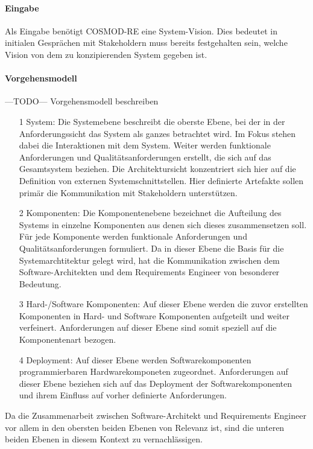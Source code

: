 \paragraph{Eingabe}
Als Eingabe benötigt COSMOD-RE eine System-Vision. Dies bedeutet in initialen Gesprächen mit Stakeholdern muss bereits festgehalten sein, welche Vision von dem zu konzipierenden System gegeben ist.\\

\paragraph{Vorgehensmodell}
---TODO--- Vorgehensmodell beschreiben
\begin{itemize}
\item[1] System: Die Systemebene beschreibt die oberste Ebene, bei der in der Anforderungssicht das System als ganzes betrachtet wird. Im Fokus stehen dabei die Interaktionen mit dem System. Weiter werden funktionale Anforderungen und Qualitätsanforderungen erstellt, die sich auf das Gesamtsystem beziehen. Die Architektursicht konzentriert sich hier auf die Definition von externen Systemschnittstellen. Hier definierte Artefakte sollen primär die Kommunikation mit Stakeholdern unterstützen.
\item[2] Komponenten: Die Komponentenebene bezeichnet die Aufteilung des Systems in einzelne Komponenten aus denen sich dieses zusammensetzen soll. Für jede Komponente werden funktionale Anforderungen und Qualitätsanforderungen formuliert. Da in dieser Ebene die Basis für die Systemarchtitektur gelegt wird, hat die Kommunikation zwischen dem Software-Architekten und dem Requirements Engineer von besonderer Bedeutung. 
\item[3] Hard-/Software Komponenten: Auf dieser Ebene werden die zuvor erstellten Komponenten in Hard- und Software Komponenten aufgeteilt und weiter verfeinert. Anforderungen auf dieser Ebene sind somit speziell auf die Komponentenart bezogen. 
\item[4] Deployment: Auf dieser Ebene werden Softwarekomponenten programmierbaren Hardwarekomponeten zugeordnet. Anforderungen auf dieser Ebene beziehen sich auf das Deployment der Softwarekomponenten und ihrem Einfluss auf vorher definierte Anforderungen. 
\end{itemize}
Da die Zusammenarbeit zwischen Software-Architekt und Requirements Engineer vor allem in den obersten beiden Ebenen von Relevanz ist, sind die unteren beiden Ebenen in diesem Kontext zu vernachlässigen.\\


